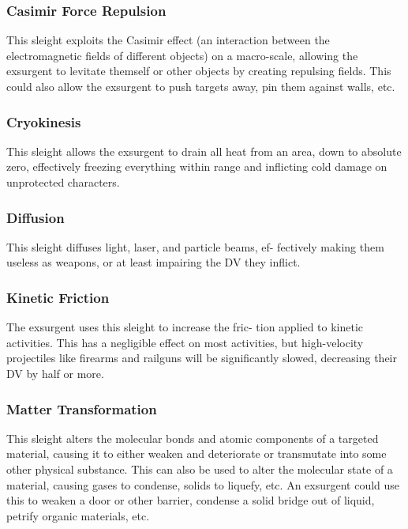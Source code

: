 \subsubsection{Casimir Force Repulsion}

This sleight exploits the Casimir effect (an interaction 
between the electromagnetic fields of different objects) 
on a macro-scale, allowing the exsurgent to levitate 
themself or other objects by creating repulsing fields. 
This could also allow the exsurgent to push targets 
away, pin them against walls, etc. 

\subsubsection{Cryokinesis}

This sleight allows the exsurgent to drain all heat from 
an area, down to absolute zero, effectively freezing 
everything within range and inflicting cold damage on 
unprotected characters.

\subsubsection{Diffusion}

This sleight diffuses light, laser, and particle beams, ef-
fectively making them useless as weapons, or at least 
impairing the DV they inflict.

\subsubsection{Kinetic Friction}

The exsurgent uses this sleight to increase the fric-
tion applied to kinetic activities. This has a negligible 
effect on most activities, but high-velocity projectiles 
like firearms and railguns will be significantly slowed, 
decreasing their DV by half or more.

\subsubsection{Matter Transformation}

This sleight alters the molecular bonds and atomic 
components of a targeted material, causing it to either 
weaken and deteriorate or transmutate into some 
other physical substance. This can also be used to 
alter the molecular state of a material, causing gases 
to condense, solids to liquefy, etc. An exsurgent could 
use this to weaken a door or other barrier, condense a 
solid bridge out of liquid, petrify organic materials, etc.

